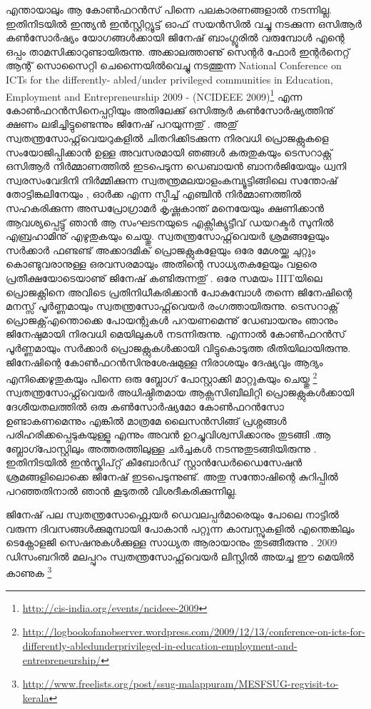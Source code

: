 എന്തായാലും ആ കോണ്‍ഫറന്‍സ് പിന്നെ പലകാരണങ്ങളാല്‍ നടന്നില്ല. ഇതിനിടയില്‍ ഇന്ത്യന്‍ ഇന്‍സ്റ്റിറ്റ്യൂട്ട് ഓഫ് സയന്‍സില്‍ വച്ചു നടക്കുന്ന ഒസിആര്‍ കണ്‍സോര്‍ഷ്യം  യോഗങ്ങള്‍ക്കായി ജിനേഷ് ബാംഗ്ലൂരില്‍ വരുമ്പോള്‍ എന്റെ ഒപ്പം താമസിക്കാറുണ്ടായിരുന്നു. അക്കാലത്താണു് സെന്റര്‍ ഫോര്‍ ഇന്റര്‍നെറ്റ് ആന്റ് സൊസൈറ്റി ചെന്നൈയില്‍വെച്ചു നടത്തുന്ന National Conference on ICTs for the differently- abled/under privileged communities in Education, Employment and Entrepreneurship 2009 - (NCIDEEE 2009)\footnote{\url{http://cis-india.org/events/ncideee-2009}} എന്ന കോണ്‍ഫറന്‍സിനെപ്പറ്റിയും അതിലേക്കു് ഒസിആര്‍ കണ്‍സോര്‍ഷ്യത്തിനു് ക്ഷണം ലഭിച്ചിട്ടുണ്ടെന്നും ജിനേഷ് പറയുന്നതു് . അതു് സ്വതന്ത്രസോഫ്റ്റ്‌വെയറുകളില്‍ ചിതറിക്കിടക്കുന്ന നിരവധി പ്രൊജക്റ്റുകളെ സംയോജിപ്പിക്കാന്‍ ഉള്ള അവസരമായി ഞങ്ങള്‍ കരുതുകയും ടെസറാക്റ്റ് ഒസിആര്‍ നിര്‍മ്മാണത്തില്‍ ഇടപെടുന്ന ഡെബായന്‍ ബാനര്‍ജിയേയും ധ്വനി സ്വരസംവേദിനി നിര്‍മ്മിക്കുന്ന സ്വതന്ത്രമലയാളംകമ്പ്യൂട്ടിങ്ങിലെ  സന്തോഷ് തോട്ടിങ്കലിനേയും , ഓര്‍ക്ക എന്ന സ്പീച്ച് എഞ്ചിന്‍ നിര്‍മ്മാണത്തില്‍ സഹകരിക്കുന്ന അന്ധപ്രോഗ്രാമര്‍ കൃഷ്ണകാന്ത് മനെയേയും ക്ഷണിക്കാന്‍ ആവശ്യപ്പെട്ടു് ഞാന്‍ ആ സംഘടനയുടെ എക്സിക്യുട്ടീവ് ഡയറക്ടര്‍ സുനില്‍ എബ്രഹാമിനു് എഴുതുകയും ചെയ്തു. സ്വതന്ത്രസോഫ്റ്റ്‌വെയര്‍ ശ്രമങ്ങളേയും സര്‍ക്കാര്‍ ഫണ്ടണ്ട് അക്കാദമിക് പ്രൊജക്റ്റുകളേയും ഒരേ മേശയ്ക്കു ചുറ്റും കൊണ്ടുവരാനുള്ള ഒരവസരമായും അതിന്റെ സാധ്യതകളേയും വളരെ പ്രതീക്ഷയോടെയാണു് ജിനേഷ് കണ്ടിരുന്നതു് . ഒരേ സമയം IIITയിലെ പ്രൊജക്റ്റിനെ അവിടെ പ്രതിനിധീകരിക്കാന്‍ പോകുമ്പോള്‍ തന്നെ ജിനേഷിന്റെ മനസ്സ് പൂര്‍ണ്ണമായും സ്വതന്ത്രസോഫ്റ്റ്‌വെയര്‍ രംഗത്തായിരുന്നു. ടെസറാക്റ്റ് പ്രൊജക്റ്റ്എന്തൊക്കെ  പോയന്റുകള്‍ പറയണമെന്നു് ഡേബായനും ഞാനും ജിനേഷുമായി നിരവധി മെയിലുകള്‍ നടന്നിരുന്നു. എന്നാല്‍ കോണ്‍ഫറന്‍സ് പൂര്‍ണ്ണമായും സര്‍ക്കാര്‍ പ്രൊജക്റ്റുകള്‍ക്കായി വിട്ടുകൊടുത്ത രീതിയിലായിരുന്നു. ജിനേഷിന്റെ കോണ്‍ഫറന്‍സിനുശേഷമുള്ള നിരാശയും ദേഷ്യവും ആദ്യം എനിക്കെഴുതുകയും പിന്നെ  ഒരു ബ്ലോഗ് പോസ്റ്റാക്കി മാറ്റുകയും ചെയ്തു \footnote{\url{http://logbookofanobserver.wordpress.com/2009/12/13/conference-on-icts-for-differently-abledunderprivileged-in-education-employment-and-entrepreneurship/}} സ്വതന്ത്രസോഫ്റ്റ്‌വെയര്‍ അധിഷ്ഠിതമായ ആക്സസിബിലിറ്റി പ്രൊജക്റ്റുകള്‍ക്കായി ദേശീയതലത്തില്‍ ഒരു കണ്‍സോര്‍ഷ്യമോ കോണ്‍ഫറന്‍സോ ഉണ്ടാകണമെന്നും എങ്കില്‍ മാത്രമേ ലൈസന്‍സിങ്ങ് പ്രശ്നങ്ങള്‍ പരിഹരിക്കപ്പെടുകയുള്ളൂ എന്നും അവന്‍ ഉറച്ചുവിശ്വസിക്കാനും തുടങ്ങി .ആ ബ്ലോഗ്പോസ്റ്റിലും അത്തരത്തിലുള്ള ചര്‍ച്ചകള്‍ നടന്നുതുടങ്ങിയിരുന്നു . ഇതിനിടയില്‍ ഇന്‍സ്ക്രിപ്റ്റ് കീബോര്‍ഡ് സ്റ്റാന്‍ഡേര്‍ഡൈസേഷന്‍ ശ്രമങ്ങളിലൊക്കെ ജിനേഷ് ഇടപെടുന്നുണ്ട്. അതു സന്തോഷിന്റെ കുറിപ്പില്‍ പറഞ്ഞതിനാല്‍ ഞാന്‍ കൂടുതല്‍ വിശദീകരിക്കുന്നില്ല.

ജിനേഷ് പല സ്വതന്ത്രസോഫ്റ്റ്വെയര്‍ ഡെവലപ്പര്‍മാരെയും പോലെ നാട്ടില്‍ വരുന്ന ദിവസങ്ങള്‍ക്കുമുമ്പായി പോകാന്‍ പറ്റുന്ന കാമ്പസ്സുകളില്‍ എന്തെങ്കിലും ടെക്നോളജി സെഷനുകള്‍ക്കുള്ള സാധ്യത ആരായാനും തുടങ്ങീരുന്നു . 2009 ഡിസംബറില്‍ മലപ്പുറം സ്വതന്ത്രസോഫ്റ്റ്‌വെയര്‍ ലിസ്റ്റില്‍ അയച്ച ഈ മെയില്‍ കാണുക \footnote{\url{http://www.freelists.org/post/ssug-malappuram/MESFSUG-regvisit-to-kerala}}

